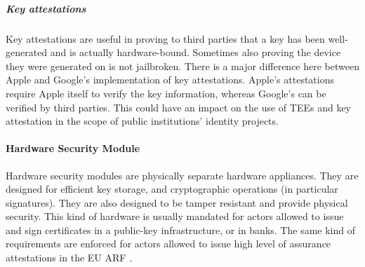 \subparagraph{Key attestations} Key attestations are useful in proving to third parties that a key has been well-generated and is actually hardware-bound. Sometimes also proving the device they were generated on is not jailbroken. There is a major difference here between Apple and Google's implementation of key attestations. Apple's attestations require Apple itself to verify the key information, whereas Google's can be verified by third parties. This could have an impact on the use of TEEs and key attestation in the scope of public institutions' identity projects.

\paragraph{Hardware Security Module} Hardware security modules are physically separate hardware appliances. They are designed for efficient key storage, and cryptographic operations (in particular signatures). They are also designed to be tamper resistant and provide physical security. This kind of hardware is usually mandated for actors allowed to issue and sign certificates in a public-key infrastructure, or in banks. The same kind of requirements are enforced for actors allowed to issue high level of assurance attestations in the EU ARF \cite{EUDI-ARF}.

